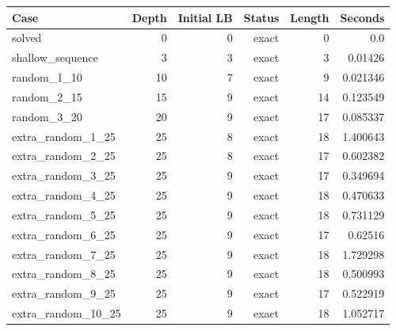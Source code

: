{\small
\begin{tabular}{lrrrrr}
\hline
Case & Depth & Initial LB & Status & Length & Seconds \\
\hline
solved & 0 & 0 & exact & 0 & 0.0 \\
shallow\_sequence & 3 & 3 & exact & 3 & 0.01426 \\
random\_1\_10 & 10 & 7 & exact & 9 & 0.021346 \\
random\_2\_15 & 15 & 9 & exact & 14 & 0.123549 \\
random\_3\_20 & 20 & 9 & exact & 17 & 0.085337 \\
extra\_random\_1\_25 & 25 & 8 & exact & 18 & 1.400643 \\
extra\_random\_2\_25 & 25 & 8 & exact & 17 & 0.602382 \\
extra\_random\_3\_25 & 25 & 9 & exact & 17 & 0.349694 \\
extra\_random\_4\_25 & 25 & 9 & exact & 18 & 0.470633 \\
extra\_random\_5\_25 & 25 & 9 & exact & 18 & 0.731129 \\
extra\_random\_6\_25 & 25 & 9 & exact & 17 & 0.62516 \\
extra\_random\_7\_25 & 25 & 9 & exact & 18 & 1.729298 \\
extra\_random\_8\_25 & 25 & 9 & exact & 18 & 0.500993 \\
extra\_random\_9\_25 & 25 & 9 & exact & 17 & 0.522919 \\
extra\_random\_10\_25 & 25 & 9 & exact & 18 & 1.052717 \\
\hline
\end{tabular}
}
